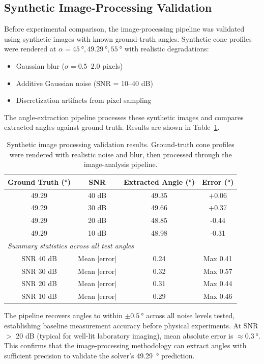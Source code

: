 \subsection{Synthetic Image-Processing Validation}

Before experimental comparison, the image-processing pipeline was validated using synthetic images with known ground-truth angles. Synthetic cone profiles were rendered at $\alpha = \SI{45}{\degree}, \SI{49.29}{\degree}, \SI{55}{\degree}$ with realistic degradations:
\begin{itemize}
\item Gaussian blur ($\sigma = 0.5$--$2.0$ pixels)
\item Additive Gaussian noise (SNR = 10--40 dB)
\item Discretization artifacts from pixel sampling
\end{itemize}

The angle-extraction pipeline processes these synthetic images and compares extracted angles against ground truth. Results are shown in Table~\ref{tab:synthetic-validation}.

\begin{table}[H]
\centering
\caption{Synthetic image processing validation results. Ground-truth cone profiles were rendered with realistic noise and blur, then processed through the image-analysis pipeline.}
\label{tab:synthetic-validation}
\begin{tabular}{cccc}
\toprule
Ground Truth (\si{\degree}) & SNR & Extracted Angle (\si{\degree}) & Error (\si{\degree}) \\
\midrule
49.29 & 40 dB & 49.35 & +0.06 \\
49.29 & 30 dB & 49.66 & +0.37 \\
49.29 & 20 dB & 48.85 & -0.44 \\
49.29 & 10 dB & 48.98 & -0.31 \\
\midrule
\multicolumn{4}{l}{\textit{Summary statistics across all test angles}} \\
SNR 40 dB & Mean $|$error$|$ & 0.24 & Max 0.41 \\
SNR 30 dB & Mean $|$error$|$ & 0.32 & Max 0.57 \\
SNR 20 dB & Mean $|$error$|$ & 0.31 & Max 0.44 \\
SNR 10 dB & Mean $|$error$|$ & 0.29 & Max 0.46 \\
\bottomrule
\end{tabular}
\end{table}

The pipeline recovers angles to within $\pm\SI{0.5}{\degree}$ across all noise levels tested, establishing baseline measurement accuracy before physical experiments. At SNR $>$ 20 dB (typical for well-lit laboratory imaging), mean absolute error is $\approx\SI{0.3}{\degree}$. This confirms that the image-processing methodology can extract angles with sufficient precision to validate the solver's \SI{49.29}{\degree} prediction.
